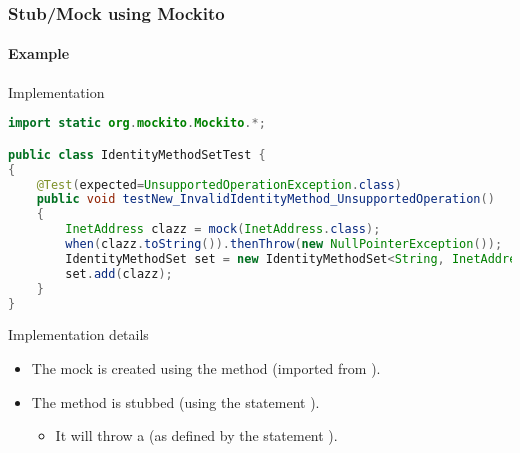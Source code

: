 \begin{frame}[hasprev=true, hasnext=false, fragile]
\frametitle{Stub/Mock using Mockito}
\framesubtitle{Example}


\begin{block}{Implementation}
\begin{lstlisting}[language=java]
import static org.mockito.Mockito.*;

public class IdentityMethodSetTest {
{
	@Test(expected=UnsupportedOperationException.class)
	public void testNew_InvalidIdentityMethod_UnsupportedOperation()
	{
		InetAddress clazz = mock(InetAddress.class);
		when(clazz.toString()).thenThrow(new NullPointerException());
		IdentityMethodSet set = new IdentityMethodSet<String, InetAddress>("toString");
		set.add(clazz);
	}
}
\end{lstlisting}
\end{block}

\begin{block}{Implementation details}
\begin{itemize}
	\item The mock is created using the method  (imported
	from ).

	\item The method  is stubbed (using the statement
	).
	\begin{itemize}
		\item It will throw a  (as defined by the
		statement ).
	\end{itemize}
\end{itemize}
\end{block}
\end{frame}
